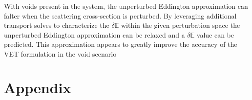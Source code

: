 \documentclass{anstrans}
\newcommand{\vr}{\vec{r}}
\newcommand{\vO}{\vec{\Omega}}
\newcommand{\bra}{\left\langle}
\newcommand{\ket}{\right\rangle}
\newcommand{\braSN}{\left\langle \! \left\langle}
\newcommand{\ketSN}{\right\rangle \! \right\rangle}
\newcommand{\sbraSN}{\left[ \! \left[}
\newcommand{\sketSN}{\right] \! \right]}
\newcommand{\sbra}{\left[}
\newcommand{\sket}{\right]}
\newcommand{\grad}{\vec{\nabla}}
\newcommand{\bound}{\partial V}
\newcommand{\vn}{\vec{n}}
\newcommand{\Edd}{\mathbb{E}}
\newcommand{\sigt}{\sigma_t}
\newcommand{\sigs}{\sigma_s}
\newcommand{\angSourced}{\frac{\delta q}{4 \pi}}
\newcommand{\qoi}{{\it QoI}\xspace}
\begin{document}
With voids present in the system, the unperturbed Eddington approximation can falter when the scattering cross-section is perturbed. By leveraging additional transport solves to characterize the $\delta \Edd$ within the given perturbation space the unperturbed Eddington approximation can be relaxed and a $\delta \Edd$ value can be predicted. This approximation appears to greatly improve the accuracy of the VET formulation in the void scenario

\appendix
\section{Appendix}

%
\end{document}
